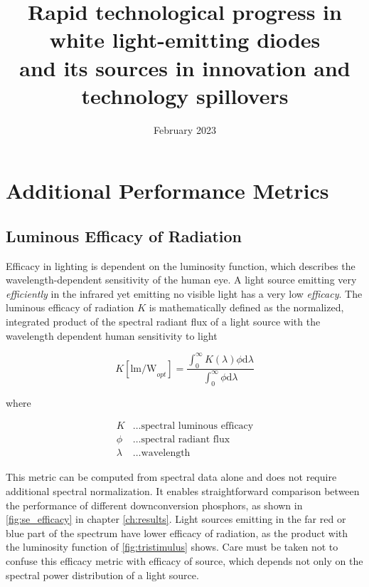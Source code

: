 \documentclass[10pt]{article}
\title{Rapid technological progress in white light-emitting diodes \\ and its sources in innovation and technology spillovers  }
\date{February 2023}
\newcounter{defcounter}
\newenvironment{myequation}{%
\addtocounter{equation}{-1}
\refstepcounter{defcounter}
\renewcommand\theequation{SI\thedefcounter}
\begin{equation}}
{\end{equation}}
\begin{document}
\setlength{\fboxsep}{10pt}

\tableofcontents

\newpage

\section{Additional Performance Metrics}

\subsection{Luminous Efficacy of Radiation}
\label{subsec:ler}

Efficacy in lighting is dependent on the luminosity function, which describes the wavelength-dependent sensitivity of the human eye. A light source emitting very \textit{efficiently} in the infrared yet emitting no visible light has a very low \textit{efficacy}. The luminous efficacy of radiation $K$ is mathematically defined as the normalized, integrated product of the spectral radiant flux of a light source with the wavelength dependent human sensitivity to light \cite{cie-term-effrad}

\begin{myequation}
\label{eqn:ler}
    K [\text{lm/W}_{opt}]= \frac{\int_0^\infty K( \lambda ) \phi \text{d} \lambda}{\int_0^\infty \phi \text{d} \lambda}
\end{myequation}

where

\begin{align*}
    K &\dots \text{spectral luminous efficacy} \\
    \phi &\dots \text{spectral radiant flux} \\
    \lambda &\dots \text{wavelength}
\end{align*}

This metric can be computed from spectral data alone and does not require additional spectral normalization. It enables straightforward comparison between the performance of different downconversion phosphors, as shown in  \cref{fig:se_efficacy} in chapter \cref{ch:results}. Light sources emitting in the far red or blue part of the spectrum have lower efficacy of radiation, as the product with the luminosity function of  \cref{fig:tristimulus} shows. Care must be taken not to confuse this efficacy metric with efficacy of source, which depends not only on the spectral power distribution of a light source.
\end{document}
